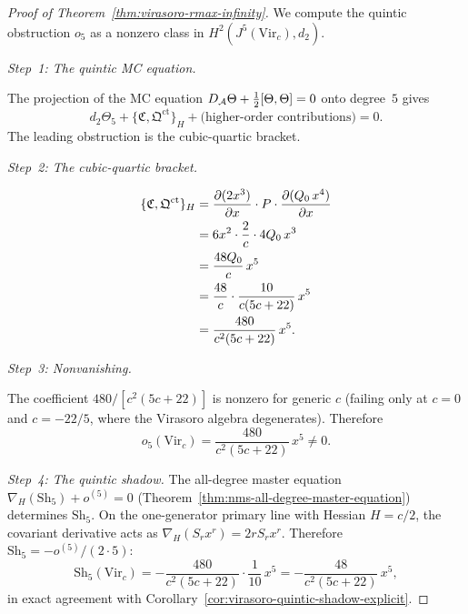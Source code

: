 \begin{proof}[Proof of Theorem~\textup{\ref{thm:virasoro-rmax-infinity}}]
We compute the quintic obstruction $o_5$ as a nonzero
class in $H^2(J^5(\mathrm{Vir}_c), d_2)$.

\medskip
\emph{Step~1: The quintic MC equation.}

The projection of the MC equation
$D_{\mathcal{A}} \Theta + \frac{1}{2}[\Theta, \Theta] = 0$
onto degree~$5$ gives
\begin{equation}\label{eq:quintic-mc-equation}
d_2 \Theta_5 +
\{\mathfrak{C}, \mathfrak{Q}^{\mathrm{ct}}\}_H
+ \text{(higher-order contributions)} = 0.
\end{equation}
The leading obstruction is the cubic-quartic bracket.

\medskip
\emph{Step~2: The cubic-quartic bracket.}

\begin{align}
\{\mathfrak{C}, \mathfrak{Q}^{\mathrm{ct}}\}_H
&= \frac{\partial(2x^3)}{\partial x}
 \cdot P \cdot
 \frac{\partial(Q_0\,x^4)}{\partial x} \notag \\
&= 6x^2 \cdot \frac{2}{c} \cdot 4Q_0\,x^3 \notag \\
&= \frac{48Q_0}{c}\,x^5 \notag \\
&= \frac{48}{c} \cdot \frac{10}{c(5c+22)}\,x^5 \notag \\
&= \frac{480}{c^2(5c+22)}\,x^5.
 \label{eq:quintic-cubic-quartic}
\end{align}

\medskip
\emph{Step~3: Nonvanishing.}

The coefficient $480/[c^2(5c+22)]$ is nonzero for
generic $c$ (failing only at $c = 0$ and $c = -22/5$,
where the Virasoro algebra degenerates). Therefore
\begin{equation}\label{eq:quintic-obstruction-clean}
o_5(\mathrm{Vir}_c) =
\frac{480}{c^2(5c+22)}\,x^5 \neq 0.
\end{equation}

\emph{Step~4: The quintic shadow.}
The all-degree master equation
$\nabla_H(\mathrm{Sh}_5) + o^{(5)} = 0$
(Theorem~\ref{thm:nms-all-degree-master-equation})
determines $\mathrm{Sh}_5$. On the one-generator primary
line with Hessian $H = c/2$, the covariant derivative
acts as $\nabla_H(S_r x^r) = 2rS_r x^r$. Therefore
$\mathrm{Sh}_5 = -o^{(5)}/(2 \cdot 5)$:
\begin{equation}\label{eq:sh5-virasoro-formula}
\mathrm{Sh}_5(\mathrm{Vir}_c)
= -\frac{480}{c^2(5c+22)} \cdot \frac{1}{10}\,x^5
= -\frac{48}{c^2(5c+22)}\,x^5,
\end{equation}
in exact agreement with
Corollary~\ref{cor:virasoro-quintic-shadow-explicit}.


\end{proof}
